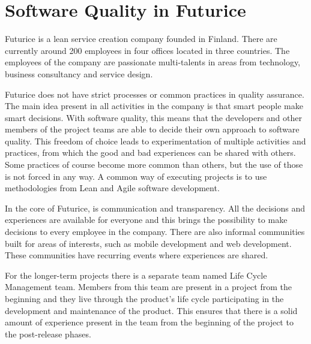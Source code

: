 
 \section{Software Quality in Futurice}

Futurice is a lean service creation company founded in Finland. There are currently around 200 employees in four offices located in three countries. The employees of the company are passionate multi-talents in areas from technology, business consultancy and service design.~\cite{futuricefact}

Futurice does not have strict processes or common practices in quality assurance. The main idea present in all activities in the company is that smart people make smart decisions. With software quality, this means that the developers and other members of the project teams are able to decide their own approach to software quality. This freedom of choice leads to experimentation of multiple activities and practices, from which the good and bad experiences can be shared with others. Some practices of course become more common than others, but the use of those is not forced in any way. A common way of executing projects is to use methodologies from Lean and Agile software development.

In the core of Futurice, is communication and transparency. All the decisions and experiences are available for everyone and this brings the possibility to make decisions to every employee in the company. There are also informal communities built for areas of interests, such as mobile development and web development. These communities have recurring events where experiences are shared.

For the longer-term projects there is a separate team named Life Cycle Management team. Members from this team are present in a project from the beginning and they live through the product's life cycle participating in the development and maintenance of the product. This ensures that there is a solid amount of experience present in the team from the beginning of the project to the post-release phases.